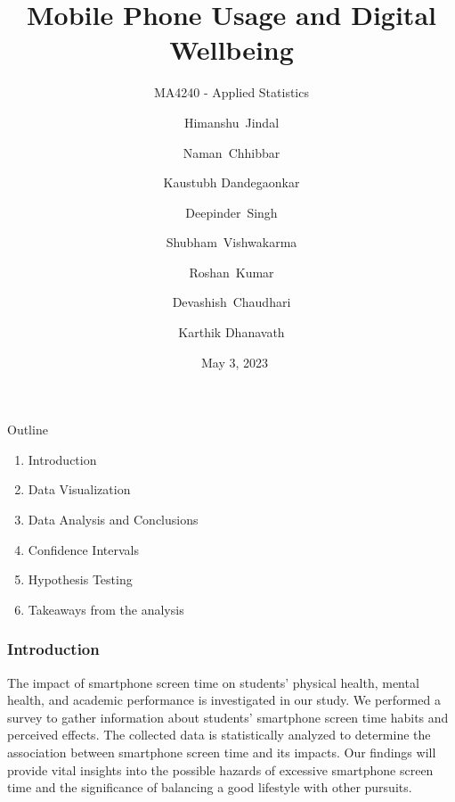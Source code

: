 \documentclass{beamer}
\title[MA4240 - Applied Statistics]{Mobile Phone Usage and Digital Wellbeing}
\subtitle{MA4240 - Applied Statistics}
\author[Group Project No: 3]{Himanshu~Jindal \and 
  Naman~Chhibbar \and
  Kaustubh Dandegaonkar\and
  Deepinder~Singh \and
  Shubham~Vishwakarma \and
  Roshan~Kumar \and
  Devashish~Chaudhari \and
  Karthik Dhanavath
  }
\date{\ May 3, 2023}
\begin{document}
\begin{frame}
\titlepage
\end{frame}


\begin{frame}{Outline}
    \begin{enumerate}
    \item{Introduction}
    \item{Data Visualization}
    \item{Data Analysis and Conclusions}
    \item{Confidence Intervals}
    \item{Hypothesis Testing}
    \item{Takeaways from the analysis}
\end{enumerate}
\end{frame}


\begin{frame}
\frametitle{Introduction}
\begin{block}{}
The impact of smartphone screen time on students’ physical health, mental health, and academic performance is investigated in our study. We performed a survey
to gather information about students’ smartphone screen time habits and perceived effects.
The collected data is statistically analyzed to determine the association between smartphone
screen time and its impacts. Our findings will provide vital insights into the possible hazards of excessive smartphone screen time and the significance of balancing a good lifestyle with other pursuits.
\end{block}
\end{frame}
\end{document}
